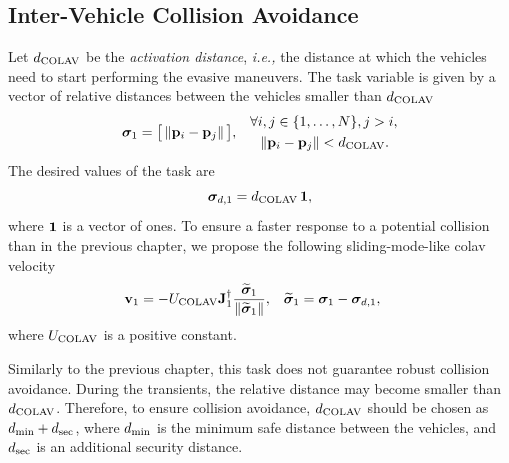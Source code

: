 \subsection{Inter-Vehicle Collision Avoidance}
\label{sec:NSB_R_COLAV}

Let {$d_{\rm COLAV}$} be the \emph{activation distance}, \emph{i.e.,} the distance at which the vehicles need to start performing the evasive maneuvers.
The task variable is given by a vector of relative distances between the vehicles smaller than $d_{\rm COLAV}$
\begin{align}
        \bm{\sigma}_1 &= \big[\left\|\mathbf{p}_i - \mathbf{p}_j\right\|\big], &
        \begin{split} 
            \forall &i,j\in\{1,\ldots,N\}, j > i, \\
            &\left\|\mathbf{p}_i - \mathbf{p}_j\right\| < d_{\rm COLAV}.
        \end{split}
\end{align}
The desired values of the task are 
\begin{equation}
    \bm{\sigma}_{d,1} = d_{\rm COLAV} \, \mathbf{1},
\end{equation}
where $\mathbf{1}$ is a vector of ones.
To ensure a faster response to a potential collision than in the previous chapter, we propose the following sliding-mode-like \gls{colav} velocity 
\begin{align}
    \mathbf{v}_1 &= - U_{\rm COLAV} \mathbf{J}_1^{\dagger} \frac{\widetilde{\bm{\sigma}}_1}{\left\|\widetilde{\bm{\sigma}}_1\right\|}, &
    \widetilde{\bm{\sigma}}_1 &= \bm{\sigma}_1 - \bm{\sigma}_{d, 1},
\end{align}
where $U_{\rm COLAV}$ is a positive constant.

Similarly to the previous chapter, this task does not guarantee robust collision avoidance.
During the transients, the relative distance may become smaller than $d_{\rm COLAV}$.
Therefore, to ensure collision avoidance, $d_{\rm COLAV}$ should be chosen as $d_{\rm min} + d_{\rm sec}$, where $d_{\rm min}$ is the minimum safe distance between the vehicles, and $d_{\rm sec}$ is an additional security distance.


